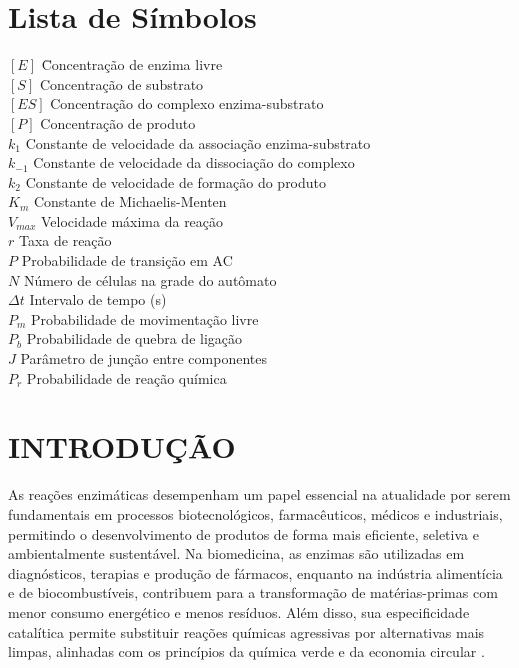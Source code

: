 \documentclass[12pt,oneside]{report}
\begin{document}
\chapter*{Lista de Símbolos}
\begin{tabbing}
    $[E]$ \hspace{2cm} \= Concentração de enzima livre \\
    $[S]$ \> Concentração de substrato \\
    $[ES]$ \> Concentração do complexo enzima-substrato \\
    $[P]$ \> Concentração de produto \\
    $k_1$ \> Constante de velocidade da associação enzima-substrato \\
    $k_{-1}$ \> Constante de velocidade da dissociação do complexo \\
    $k_2$ \> Constante de velocidade de formação do produto \\
    $K_m$ \> Constante de Michaelis-Menten \\
    $V_{max}$ \> Velocidade máxima da reação \\
    $r$ \> Taxa de reação \\
    $P$ \> Probabilidade de transição em AC \\
    $N$ \> Número de células na grade do autômato \\
    $\Delta t$ \> Intervalo de tempo (s) \\
    $P_m$ \> Probabilidade de movimentação livre \\
    $P_b$ \> Probabilidade de quebra de ligação \\
    $J$ \> Parâmetro de junção entre componentes \\
    $P_r$ \> Probabilidade de reação química \\
\end{tabbing}

\newpage

\tableofcontents
\newpage

\setcounter{page}{1}

\chapter{INTRODUÇÃO}

As reações enzimáticas desempenham um papel essencial na atualidade por serem fundamentais em processos biotecnológicos, farmacêuticos, médicos e industriais, permitindo o desenvolvimento de produtos de forma mais eficiente, seletiva e ambientalmente sustentável. Na biomedicina, as enzimas são utilizadas em diagnósticos, terapias e produção de fármacos, enquanto na indústria alimentícia e de biocombustíveis, contribuem para a transformação de matérias-primas com menor consumo energético e menos resíduos. Além disso, sua especificidade catalítica permite substituir reações químicas agressivas por alternativas mais limpas, alinhadas com os princípios da química verde e da economia circular \cite{nelson2018}.
\end{document}
